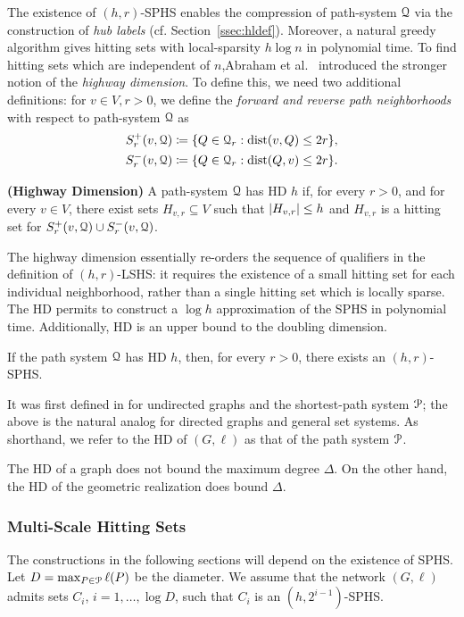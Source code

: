 The existence of $(h,r)$-SPHS enables the compression of path-system $\mathcal{Q}$ via the construction of \emph{hub labels} (cf. Section~\ref{ssec:hldef}). Moreover, a natural greedy algorithm gives hitting sets with local-sparsity $h\log n$ in polynomial time. To find hitting sets which are independent of $n$,Abraham et al.~\citep{highway2013} introduced the stronger notion of the \emph{highway dimension}. To define this, we need two additional definitions:
for $v\in V, r>0$, we define the \emph{forward and reverse path neighborhoods} with respect to path-system $\mathcal{Q}$ as 
\begin{align*}
S_r^+(v,\mathcal{Q}) &\coloneqq\{Q\in\mathcal{Q}_r: \mbox{dist}(v,Q)\leq 2r \}, \\  
S_r^-(v,\mathcal{Q}) &\coloneqq\{Q\in\mathcal{Q}_r: \mbox{dist}(Q,v)\leq 2r \}.
\end{align*}
\begin{definition}
\label{def:hddef}
\textbf{(Highway Dimension)}
A path-system $\mathcal{Q}$ has HD $h$ if, for every $r>0$, and for every $v\in V$, there exist sets $H_{v,r}\subseteq V$ such that $\lvert H_{v,r}\rvert\leq h$ and $H_{v,r}$ is a hitting set for $S_r^+(v,\mathcal{Q})\cup S_r^-(v,\mathcal{Q})$.
\end{definition}
The highway dimension essentially re-orders the sequence of qualifiers in the definition of $(h,r)$-LSHS: it requires the existence of a small hitting set for each individual neighborhood, rather than a single hitting set which is locally sparse. 
The HD permits to construct a $\log h$ approximation of the SPHS in polynomial time.
Additionally, HD is an upper bound to the doubling dimension.


\begin{proposition}
If the path system $\mathcal{Q}$ has HD $h$, then, for every $r>0$, there exists an $(h,r)$-SPHS.
\end{proposition}
It was first defined in \citet{highway2013} for undirected graphs and the shortest-path system $\mathcal{P}$; the above is the natural analog for directed graphs and general set systems. As shorthand, we refer to the HD of $(G,\ell)$ as that of the path system $\mathcal{P}$.

The HD of a graph does not bound the maximum degree $\Delta$.
On the other hand, the HD of the geometric realization does bound $\Delta$.


\subsubsection{Multi-Scale Hitting Sets} \label{sec:multi_scale}
The constructions in the following sections will depend on the existence of SPHS.
Let $D=\max_{P\in\mathcal{P}}\ell(P)$ be the diameter.
We assume that the network $(G,\ell)$ admits sets $C_i$, $i=1,\ldots,\log D$, such that $C_i$ is an $(h,2^{i-1})$-SPHS.


